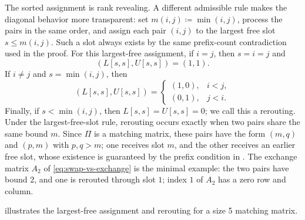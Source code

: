 \documentclass[preprint,12pt]{elsarticle}
\theoremstyle{plain}
\theoremstyle{nonumberplain}
\numberwithin{equation}{section}
\numberwithin{theorem}{section}
\begin{document}
\begin{remark}[rerouting]\label{rem:rerouting}
  The sorted assignment is rank revealing. A different admissible rule makes the diagonal behavior more transparent: set $m(i,j)\coloneq\min(i,j)$, process the pairs in the same order, and assign each pair $(i,j)$ to the largest free slot $s\le m(i,j)$. Such a slot always exists by the same prefix-count contradiction used in the proof. For this largest-free assignment, if $i=j$, then $s=i=j$ and
  \[
    (L[s,s],U[s,s])=(1,1).
  \]
  If $i\ne j$ and $s=\min(i,j)$, then
  \[
    (L[s,s],U[s,s])=
    \begin{cases}
      (1,0), & i<j,\\
      (0,1), & j<i.
    \end{cases}
  \]
  Finally, if $s<\min(i,j)$, then $L[s,s]=U[s,s]=0$; we call this a rerouting. Under the largest-free-slot rule, rerouting occurs exactly when two pairs share the same bound $m$. Since $\Pi$ is a matching matrix, these pairs have the form $(m,q)$ and $(p,m)$ with $p,q>m$; one receives slot $m$, and the other receives an earlier free slot, whose existence is guaranteed by the prefix condition in . The exchange matrix $A_2$ of \cref{eq:swap-vs-exchange} is the minimal example: the two pairs have bound $2$, and one is rerouted through slot $1$; index $1$ of $A_2$ has a zero row and column.
\end{remark}

 illustrates the largest-free assignment and rerouting for a size 5 matching matrix.
\end{document}
